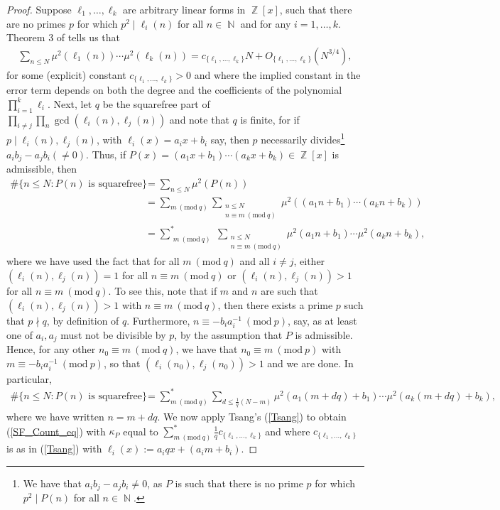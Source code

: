 \documentclass[11pts]{amsart}
\numberwithin{equation}{section}
\DeclareMathOperator{\Z}{\mathbb{Z}}
\DeclareMathOperator{\N}{\mathbb{N}}
\newcommand{\Mod}[1]{\ (\text{mod}\ #1)}
\begin{document}
\begin{proof}
    Suppose $\ell_1,\dots,\ell_k$ are arbitrary linear forms in $\Z[x]$, such that there are no primes $p$ for which $p^2\mid \ell_i(n)$ for all $n\in\N$ and for any $i=1,\dots,k$. Theorem 3 of \cite{Tsang_HL} tells us that
    \begin{align}
    \label{Tsang}
    \sum_{n\leq N}\mu^2(\ell_1(n))\cdots\mu^2(\ell_k(n)) = c_{\{\ell_1,\dots,\ell_k\}}N + O_{\{\ell_1,\dots,\ell_k\}}\left(N^{3/4}\right),
    \end{align}
    for some (explicit) constant $c_{\{\ell_1,\dots,\ell_k\}}>0$ and where the implied constant in the error term depends on both the degree and the coefficients of the polynomial $\prod_{i=1}^k \ell_i$. Next, let $q$ be the squarefree part of $\prod_{i\neq j}\prod_{n}\gcd(\ell_i(n),\ell_j(n))$ and note that $q$ is finite, for if $p\mid \ell_i(n),\ell_j(n)$, with $\ell_i(x)=a_ix+b_i$ say, then $p$ necessarily divides\footnote{We have that $a_ib_j-a_jb_i\neq 0$, as $P$ is such that there is no prime $p$ for which $p^2\mid P(n)$ for all $n\in\N$.} $a_ib_j-a_jb_i(\neq 0)$.  Thus, if $P(x)=(a_1x+b_1)\cdots (a_kx+b_k)\in\Z[x]$ is admissible, then
    \begin{align*}
        \#\{n\leq N: \text{$P(n)$ is squarefree}\}
        &=
        \sum_{n\leq N}\mu^2(P(n))\\
        &=
        \sum_{m\Mod{q}}\sum_{\substack{{n\leq N}\\{n\equiv m\Mod{q}}}}\mu^2((a_1n+b_1)\cdots (a_kn+b_k))\\
        &=
        \sum_{\substack{{m\Mod{q}}}}^*\sum_{\substack{{n\leq N}\\{n\equiv m\Mod{q}}}}\mu^2(a_1n+b_1)\cdots \mu^2(a_kn+b_k),       
    \end{align*}
    where we have used the fact that for all $m\Mod{q}$ and all $i\neq j$, either $(\ell_i(n),\ell_j(n))=1$ for all $n\equiv m\Mod{q}$ or $(\ell_i(n),\ell_j(n))>1$ for all $n\equiv m\Mod{q}$. To see this, note that if $m$ and $n$ are such that $(\ell_i(n),\ell_j(n))>1$ with $n\equiv m\Mod{q}$, then there exists a prime $p$ such that $p\nmid q$, by definition of $q$. Furthermore,  $n\equiv -b_ia_i^{-1} \Mod{p}$, say, as at least one of $a_i,a_j$ must not be divisible by $p$, by the assumption that $P$ is admissible. Hence, for any other $n_0\equiv m \Mod{q}$, we have that $n_0\equiv m \Mod{p}$ with $m\equiv -b_ia_i^{-1}\Mod{p}$, so that $(\ell_i(n_0),\ell_j(n_0))>1$ and we are done. 
    In particular,
    \begin{align*}
        \#\{n\leq N: \text{$P(n)$ is squarefree}\}
        &=
        \sum_{m\Mod{q}}^*
        \sum_{d\leq \frac{1}{q}(N-m)}
        \mu^2(a_1(m+dq)+b_1)\cdots \mu^2(a_k(m+dq)+b_k),
    \end{align*}
    where we have written $n=m+dq$. We now apply Tsang's (\ref{Tsang}) to obtain (\ref{SF_Count_eq}) with $\kappa_P$ equal to $\sum_{m\Mod{q}}^*\frac{1}{q}c_{\{\ell_1,\dots,\ell_k\}}$ and where $c_{\{\ell_1,\dots,\ell_k\}}$ is as in (\ref{Tsang}) with $\ell_i(x):=a_iqx + (a_im+b_i)$.
\end{proof}
\end{document}
